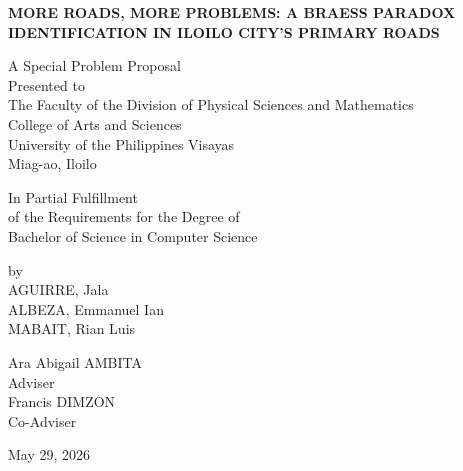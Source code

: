 \begin{titlepage}
    \begin{center}
        
        \textbf{\MakeUppercase{More Roads, More Problems: A Braess Paradox Identification in Iloilo City's Primary Roads}}
        
        \vfill 
        
        A Special Problem Proposal \\
        Presented to \\
        The Faculty of the Division of Physical Sciences and Mathematics \\
        College of Arts and Sciences \\
        University of the Philippines Visayas \\
        Miag-ao, Iloilo
        
        \vfill
        
        In Partial Fulfillment \\
        of the Requirements for the Degree of \\
        Bachelor of Science in Computer Science
        
        \vfill
        
        by \\
        \vspace{0.5cm}
        {AGUIRRE, Jala} \\
        {ALBEZA, Emmanuel Ian} \\
        {MABAIT, Rian Luis}
        
        \vfill
        
        Ara Abigail AMBITA \\
        Adviser \\
        \vspace{0.3cm}
        Francis DIMZON \\
        Co-Adviser \\

        
        
        \vfill
        
        May 29, 2026
        
    \end{center}
\end{titlepage}